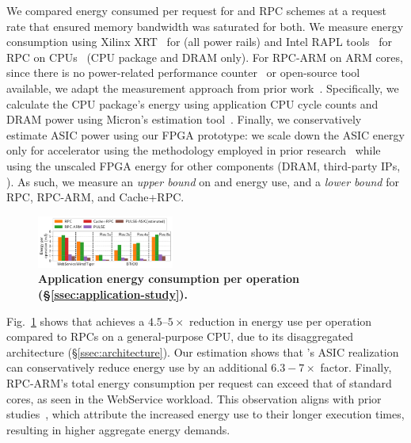  We compared energy consumed per request for \pulse and RPC schemes at a request rate that ensured memory bandwidth was saturated for both. We measure energy consumption using Xilinx XRT~\cite{xilinx_xrt} for \pulse (all power rails) and Intel RAPL tools~\cite{intel_rapl} for RPC on CPUs~\cite{intelprocessor} (CPU package and DRAM only). For RPC-ARM on ARM cores, since there is no power-related performance counter~\cite{armv8registers} or open-source tool available, we adapt the measurement approach from prior work~\cite{clio}. Specifically, we calculate the CPU package's energy using application CPU cycle counts and DRAM power using Micron's estimation tool~\cite{micron}. Finally, we conservatively estimate ASIC power using our FPGA prototype: we scale down the ASIC energy only for \pulse accelerator using the methodology employed in prior research~\cite{asicpower} while using the unscaled FPGA energy for other components (DRAM, third-party IPs, \etc). As such, we measure an \emph{upper bound} on \pulse and \pulseasic energy use, and a \emph{lower bound} for RPC, RPC-ARM, and Cache+RPC.

\begin{figure}[t]
\centering
\includegraphics[width=0.4\textwidth]{fig/pulse/power.pdf}
\vspace{-1em}
\caption[Application energy consumption per operation]{\textbf{Application energy consumption per operation (\S\ref{ssec:application-study}).}}
\label{fig:eval_energy}%
\end{figure}

Fig.~\ref{fig:eval_energy} shows that \pulse achieves a $4.5$--$5\times$ reduction in energy use per operation compared to RPCs on a general-purpose CPU, due to its disaggregated architecture (\S\ref{ssec:architecture}). Our estimation shows that \pulse's ASIC realization can conservatively reduce energy use by an additional $6.3-7\times$ factor. 
Finally, RPC-ARM's total energy consumption per request can exceed that of standard cores, as seen in the WebService workload. This observation aligns with prior studies~\cite{clio}, which attribute the increased energy use to their longer execution times, resulting in higher aggregate energy demands.

